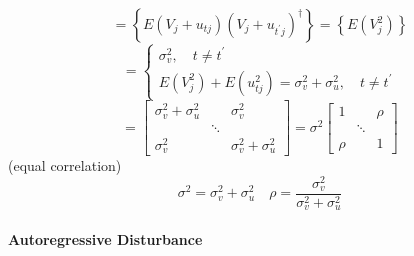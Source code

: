\documentclass{article}
\begin{document}
\begin{equation*}
=\left\{ E\left( V_{j}+u_{tj}\right) \left( V_{j}+u_{t^{\prime }j}\right)
^{\dagger }\right\} =\left\{ E\left( V_{j}^{2}\right) \right\} 
\end{equation*}%
\begin{equation*}
=\left\{ 
\begin{array}{c}
\sigma _{v}^{2},\quad t\neq t^{\prime } \\ 
E\left( V_{j}^{2}\right) +E\left( u_{tj}^{2}\right) =\sigma _{v}^{2}+\sigma
_{u}^{2},\quad t\neq t^{\prime }%
\end{array}%
\right. 
\end{equation*}%
\begin{equation*}
=\left[ 
\begin{array}{ccc}
\sigma _{v}^{2}+\sigma _{u}^{2} &  & \sigma _{v}^{2} \\ 
& \ddots  &  \\ 
\sigma _{v}^{2} &  & \sigma _{v}^{2}+\sigma _{u}^{2}%
\end{array}%
\right] =\sigma ^{2}\left[ 
\begin{array}{ccc}
1 &  & \rho  \\ 
& \ddots  &  \\ 
\rho  &  & 1%
\end{array}%
\right] 
\end{equation*}%
(equal correlation)%
\begin{equation*}
\sigma ^{2}=\sigma _{v}^{2}+\sigma _{u}^{2}\quad \rho =\frac{\sigma _{v}^{2}%
}{\sigma _{v}^{2}+\sigma _{u}^{2}}
\end{equation*}

\bigskip 

\paragraph{Autoregressive Disturbance}

\quad 

\bigskip 
\end{document}
